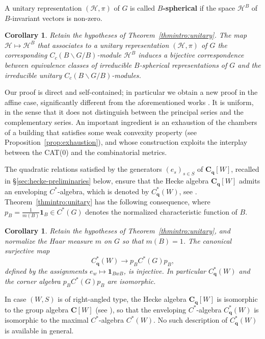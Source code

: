 \documentclass[12pt,a4paper]{amsproc}
\newtheorem{corintro}[thmintro]{Corollary}
\theoremstyle{definition}
\newcommand{\CC}{\mathbf C}
\newcommand{\one}{\mathbf 1}
\begin{document}
A unitary representation  $(\mathcal H, \pi)$ of $G$ is called \textbf{$B$-spherical} if the space $\mathcal H^B$ of $B$-invariant vectors is non-zero. 

\begin{corintro}\label{cor:equivalence}
Retain the hypotheses of Theorem~\ref{thmintro:unitary}. The map $\mathcal H \mapsto \mathcal H^B$ that associates to a  unitary representation $(\mathcal H, \pi)$ of $G$  the corresponding $C_c(B\backslash G/B)$-module $ \mathcal H^B$ induces a bijective correspondence between   equivalence classes of irreducible $B$-spherical representations of $G$ and the irreducible unitary $C_c(B\backslash G/B)$-modules.
\end{corintro}

Our proof is direct and self-contained; in particular we obtain a new proof in the affine case, significantly different from the aforementioned works \cite{BM89, BM93, Ciubotaru, Matsumoto}. It is uniform, in the sense that it does not distinguish between the principal series and the complementary series. An important ingredient is an exhaustion of the chambers of a building that satisfies some weak convexity property   (see Proposition~\ref{prop:exhaustion}), and whose construction exploits the interplay between the CAT($0$)  and the combinatorial metrics.

\medskip

The quadratic relations satisfied by the generators $(e_s)_{s \in S}$ of $\CC_{\mathbf q}[W]$, recalled in \S\ref{sec:hecke-preliminaries} below, ensure that the Hecke algebra	$\CC_{\mathbf q}[W]$ admits an enveloping $C^*$-algebra, which is denoted by $C^*_{\mathbf q}(W)$, see \cite[\S 2.4.2]{Matsumoto}. Theorem~\ref{thmintro:unitary} has the following consequence, where  $p_B = \frac 1 {m(B)} \one_B \in C^*(G)$ denotes the normalized characteristic function of $B$. 


\begin{corintro}\label{corintro:corner}
Retain the hypotheses of Theorem~\ref{thmintro:unitary}, and normalize the Haar measure $m$ on $G$ so that $m(B)=1$. The canonical surjective map
$$C^*_{\mathbf q}(W) \to p_B C^*(G) p_B,$$ 
defined by the assignments $e_w \mapsto \one_{BwB}$, is injective. In particular $C^*_{\mathbf q}(W) $ and the corner algebra $p_B C^*(G) p_B$ are isomorphic.  
\end{corintro}
	
In case $(W, S)$ is of right-angled type, the Hecke algebra 	$\CC_{\mathbf q}[W]$ is isomorphic to the group algebra $\CC[W]$ (see \cite[Proposition~4.2]{CKL}), so that the enveloping $C^*$-algebra $C^*_{\mathbf q}(W)$ is isomorphic to the maximal $C^*$-algebra $C^*(W)$. No such description of $C^*_{\mathbf q}(W)$ is available in general. 
	
\end{document}
